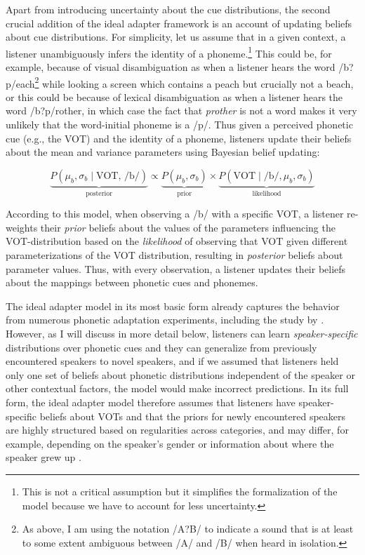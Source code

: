 Apart from introducing uncertainty about the cue distributions, the second crucial addition of the ideal adapter framework is an account of updating beliefs about cue distributions. For simplicity,
let us assume that in a given context, a listener unambiguously infers the identity of a phoneme.\footnote{This is not a critical assumption but it simplifies the formalization of the model because we have to account for less uncertainty.} This could be, for example, because of visual disambiguation as when a listener hears the word /b?p/each\footnote{As above, I am using the notation /A?B/ to indicate a sound that is at least to some extent ambiguous between /A/ and /B/ when heard in isolation.} 
while looking a screen which contains a peach but crucially not a beach, or this could be because of lexical disambiguation as when a listener hears the word /b?p/rother, in which case the fact that \textit{prother} is not a
word makes it very unlikely that the word-initial phoneme is a /p/. Thus given a perceived phonetic cue (e.g., the VOT) and the identity of a phoneme, listeners update their beliefs about the mean and variance parameters 
using Bayesian belief updating:

$$ \underbrace{P(\mu_b, \sigma_b \mid \mbox{VOT, /b/})}_{\text{posterior}} \propto \underbrace{P(\mu_b, \sigma_b)}_{\text{prior}} \times   \underbrace{P(\mbox{VOT} \mid \mbox{/b/}, \mu_b, \sigma_b)}_{\text{likelihood}} $$

\noindent According to this model, when observing a /b/ with a specific VOT, a listener re-weights their \textit{prior} beliefs about the values of the parameters influencing the VOT-distribution based on the \textit{likelihood} of observing that VOT given different parameterizations of the VOT distribution, resulting in \textit{posterior} beliefs about parameter values. Thus, with every observation, a listener updates their beliefs about the mappings between phonetic cues and phonemes. 

The ideal adapter model in its most basic form already captures the behavior from numerous phonetic adaptation experiments, including the study by \textcite{Norris2003}. However, as I will discuss in more detail below,
listeners can learn \textit{speaker-specific} distributions over phonetic cues and they can generalize from previously encountered speakers to novel speakers, and if we assumed that listeners held only 
one set of beliefs about phonetic distributions independent of the speaker or other contextual factors, the model would make incorrect predictions. In its full form, the ideal adapter model therefore assumes that 
listeners have speaker-specific beliefs about VOTs and that the priors for newly encountered speakers are highly structured based on regularities across categories, and may differ, for example, depending on the speaker's gender or
information about where the speaker grew up \cite{Kleinschmidt2019}.

